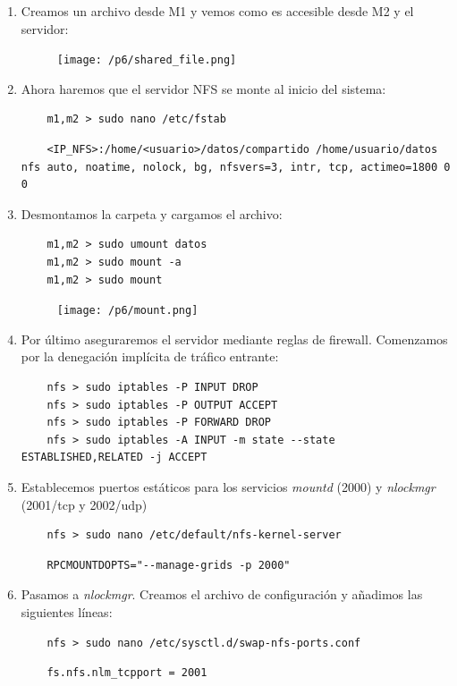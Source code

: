 \documentclass[12pt,spanish]{article}
\begin{document}
\begin{enumerate}
	\item Creamos un archivo desde M1 y vemos como es accesible desde M2 y el servidor:
	\begin{figure}[H]
		\centering
		\texttt{[image: /p6/shared\_file.png]}
	\end{figure}
	\item Ahora haremos que el servidor NFS se monte al inicio del sistema:
	\begin{lstlisting}
	m1,m2 > sudo nano /etc/fstab
	\end{lstlisting}
	\begin{lstlisting}
	<IP_NFS>:/home/<usuario>/datos/compartido /home/usuario/datos nfs auto, noatime, nolock, bg, nfsvers=3, intr, tcp, actimeo=1800 0 0
	\end{lstlisting}
	\newpage
	\item Desmontamos la carpeta y cargamos el archivo:
	\begin{lstlisting}
	m1,m2 > sudo umount datos
	m1,m2 > sudo mount -a
	m1,m2 > sudo mount
	\end{lstlisting}
	\begin{figure}[H]
		\centering
		\texttt{[image: /p6/mount.png]}
	\end{figure}
	\item Por último aseguraremos el servidor mediante reglas de firewall. Comenzamos por la denegación implícita de tráfico entrante:
	\begin{lstlisting}
	nfs > sudo iptables -P INPUT DROP
	nfs > sudo iptables -P OUTPUT ACCEPT
	nfs > sudo iptables -P FORWARD DROP
	nfs > sudo iptables -A INPUT -m state --state ESTABLISHED,RELATED -j ACCEPT
	\end{lstlisting}
	\item Establecemos puertos estáticos para los servicios \emph{mountd} (2000) y \emph{nlockmgr} (2001/tcp y 2002/udp)
	\begin{lstlisting}
	nfs > sudo nano /etc/default/nfs-kernel-server
	\end{lstlisting}
	\begin{lstlisting}
	RPCMOUNTDOPTS="--manage-grids -p 2000"
	\end{lstlisting}
	\item Pasamos a  \emph{nlockmgr}. Creamos el archivo de configuración y añadimos las siguientes líneas:
	\begin{lstlisting}
	nfs > sudo nano /etc/sysctl.d/swap-nfs-ports.conf
	\end{lstlisting}
	\begin{lstlisting}
	fs.nfs.nlm_tcpport = 2001

\end{lstlisting}
\end{enumerate}
\end{document}
